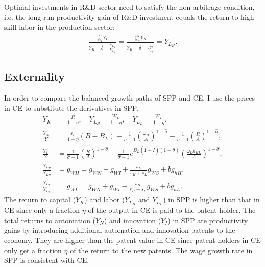 \documentclass[12pt]{article}
\begin{document}
Optimal investments in R\&D sector need to satisfy the non-arbitrage condition, i.e. the long-run productivity gain of R\&D investment equals the return to high-skill labor in the production sector: 
\begin{align*}
\frac{\frac{\delta \dot{I}}{\delta \epsilon_I}Y_I}{Y_K-\delta-\frac{\dot{Y}_{L_H}}{Y_{L_H}}} = \frac{\frac{\delta \dot{N}}{\delta \epsilon_N}Y_N}{Y_K-\delta-\frac{\dot{Y}_{L_H}}{Y_{L_H}}} = Y_{L_H}.
\end{align*}

\subsection{Externality}
In order to compare the balanced growth paths of SPP and CE, I use the prices in CE to substitute the derivatives in SPP.  
\begin{align*}
Y_K &= \frac{R}{1-\eta}, \quad Y_{L_H}= \frac{W_H}{1-\eta}, \quad Y_{L_L}= \frac{W_L}{1-\eta}, \\
\frac{Y_{N}}{Y} &=\frac{s_L}{1-\eta}(B-B_L)+\frac{1}{\hat{\sigma}-1}(\frac{\omega_H}{A})^{1-\hat{\sigma}}-\frac{1}{\hat{\sigma}-1}(\frac{R}{A})^{1-\hat{\sigma}}, \\
\frac{Y_{I}}{Y} &=\frac{1}{\hat{\sigma}-1}(\frac{R}{A})^{1-\hat{\sigma}}-\frac{1}{\hat{\sigma}-1}e^{B_L(1-\tilde{I})(1-\hat{\sigma})}(\frac{\omega_Lh_{HL}}{A})^{1-\hat{\sigma}}, \\
\frac{\dot{Y}_{L_H}}{Y_{L_H}} &= g_{WH} = g_{WN}+g_{WI}+\frac{s_L}{s_H+s_L}g_{WS} +bg_{hH},\\
\frac{\dot{Y}_{L_L}}{Y_{L_L}} &= g_{WL} = g_{WN}+g_{WI}-\frac{s_H}{s_H+s_L}g_{WS} +bg_{hL}.
\end{align*}
The return to capital ($Y_K$) and labor ($Y_{L_H}$ and $Y_{L_L}$) in SPP is higher than that in CE since only a fraction $\eta$ of the output in CE is paid to the patent holder. The total returns to automation ($Y_N$) and innovation ($Y_I$) in SPP are productivity gains by introducing additional automation and innovation patents to the economy. They are higher than the patent value in CE since patent holders in CE only get a fraction $\eta$ of the return to the new patents. The wage growth rate in SPP is consistent with CE. 
\end{document}
